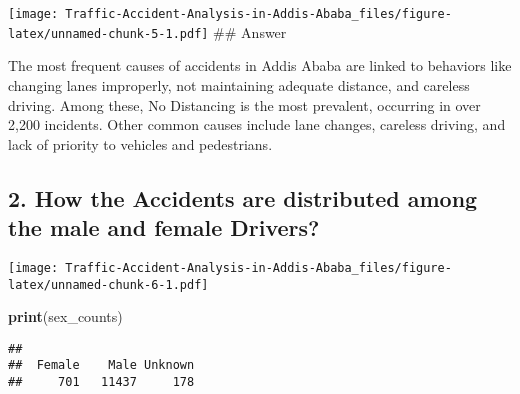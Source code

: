 \documentclass[
]{article}
\newenvironment{Shaded}{\begin{snugshade}}{\end{snugshade}}
\newcommand{\AttributeTok}[1]{\textcolor[rgb]{0.13,0.29,0.53}{#1}}
\newcommand{\DecValTok}[1]{\textcolor[rgb]{0.00,0.00,0.81}{#1}}
\newcommand{\FunctionTok}[1]{\textcolor[rgb]{0.13,0.29,0.53}{\textbf{#1}}}
\newcommand{\NormalTok}[1]{#1}
\newcommand{\OtherTok}[1]{\textcolor[rgb]{0.56,0.35,0.01}{#1}}
\newcommand{\SpecialCharTok}[1]{\textcolor[rgb]{0.81,0.36,0.00}{\textbf{#1}}}
\newcommand{\StringTok}[1]{\textcolor[rgb]{0.31,0.60,0.02}{#1}}
\begin{document}
\texttt{[image: Traffic-Accident-Analysis-in-Addis-Ababa\_files/figure-latex/unnamed-chunk-5-1.pdf]}
\#\# Answer

The most frequent causes of accidents in Addis Ababa are linked to
behaviors like changing lanes improperly, not maintaining adequate
distance, and careless driving. Among these, No Distancing is the most
prevalent, occurring in over 2,200 incidents. Other common causes
include lane changes, careless driving, and lack of priority to vehicles
and pedestrians.

\hypertarget{how-the-accidents-are-distributed-among-the-male-and-female-drivers}{%
\subsection{2. How the Accidents are distributed among the male and
female
Drivers?}\label{how-the-accidents-are-distributed-among-the-male-and-female-drivers}}

\begin{Shaded}
\end{Shaded}

\texttt{[image: Traffic-Accident-Analysis-in-Addis-Ababa\_files/figure-latex/unnamed-chunk-6-1.pdf]}

\begin{Shaded}
\begin{Highlighting}[]
\FunctionTok{print}\NormalTok{(sex\_counts)}
\end{Highlighting}
\end{Shaded}

\begin{verbatim}
## 
##  Female    Male Unknown 
##     701   11437     178
\end{verbatim}
\end{document}
